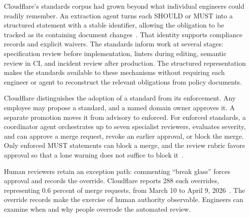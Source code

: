 
Cloudflare's standards corpus had grown beyond what individual engineers could readily remember. An extraction agent turns each SHOULD or MUST into a structured statement with a stable identifier, allowing the obligation to be tracked as its containing document changes~\citep{reimann2026codex}. That identity supports compliance records and explicit waivers. The standards inform work at several stages: specification review before implementation, linters during editing, semantic review in CI, and incident review after production. The structured representation makes the standards available to these mechanisms without requiring each engineer or agent to reconstruct the relevant obligations from policy documents.


Cloudflare distinguishes the adoption of a standard from its enforcement. Any employee may propose a standard, and a named domain owner approves it. A separate promotion moves it from advisory to enforced. For enforced standards, a coordinator agent orchestrates up to seven specialist reviewers, evaluates severity, and can approve a merge request, revoke an earlier approval, or block the merge. Only enforced MUST statements can block a merge, and the review rubric favors approval so that a lone warning does not suffice to block it~\citep{skidmore2026review}.

Human reviewers retain an exception path: commenting ``break glass'' forces approval and records the override. Cloudflare reports 288 such overrides, representing 0.6 percent of merge requests, from March 10 to April 9, 2026~\citep{skidmore2026review}. The override records make the exercise of human authority observable. Engineers can examine when and why people overrode the automated review.


